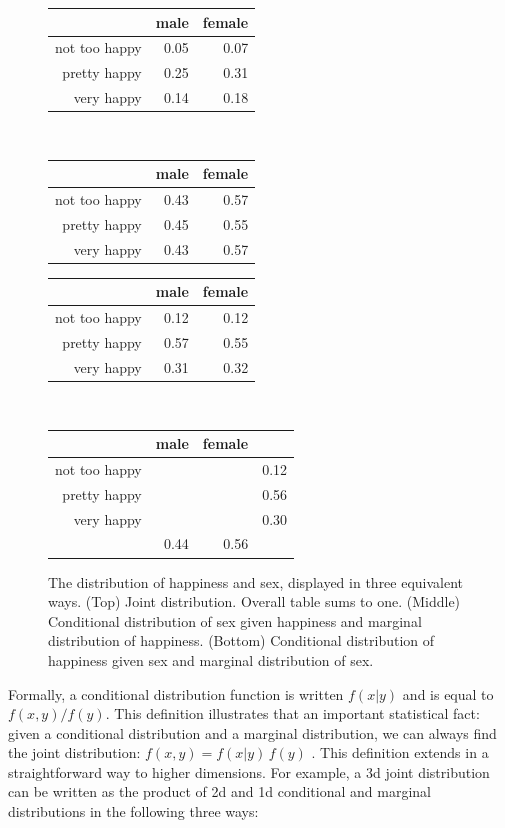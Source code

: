 \documentclass[journal]{vgtc}
\begin{document}
\begin{figure}[ht]
  \begin{tabular}{rrr}
  \toprule
  & male & female \\ 
  \midrule
  not too happy & 0.05 & 0.07 \\ 
  pretty happy & 0.25 & 0.31 \\ 
  very happy & 0.14 & 0.18 \\ 
  \bottomrule
  \end{tabular}
  \\[1em]

  \begin{tabular}{rrr}
  \toprule
  & male & female \\
  \midrule
  not too happy & 0.43 & 0.57 \\
  pretty happy & 0.45 & 0.55 \\ 
  very happy & 0.43 & 0.57 \\
  \bottomrule
  \end{tabular}\hspace{1em}%
  \begin{tabular}{rrr}
  \toprule
  & male & female \\ 
  \midrule
  not too happy & 0.12 & 0.12 \\ 
  pretty happy & 0.57 & 0.55 \\ 
  very happy & 0.31 & 0.32 \\
  \bottomrule
  \end{tabular}
  \\[1em]

  \begin{tabular}{rrrr}
  \toprule
  & male & female & \\ 
  \midrule
  not too happy & & & 0.12 \\ 
  pretty happy & & & 0.56 \\ 
  very happy & & & 0.30 \\
  & 0.44 & 0.56 \\ 
  \bottomrule
  \end{tabular}

  \caption{The distribution of happiness and sex, displayed in three equivalent ways.  (Top) Joint distribution. Overall table sums to one. (Middle) Conditional distribution of sex given happiness and marginal distribution of happiness. (Bottom) Conditional distribution of happiness given sex and marginal distribution of sex.}
  \label{fig:2d-table}
\end{figure}

Formally, a conditional distribution function is written $f(x | y)$ and is equal to $f(x, y) / f(y)$. This definition illustrates that an important statistical fact: given a conditional distribution and a marginal distribution, we can always find the joint distribution: $f(x, y) = f(x | y)\,f(y)$ \footnotemark. This definition extends in a straightforward way to higher dimensions. For example, a 3d joint distribution can be written as the product of 2d and 1d conditional and marginal distributions in the following three ways:
\end{document}

